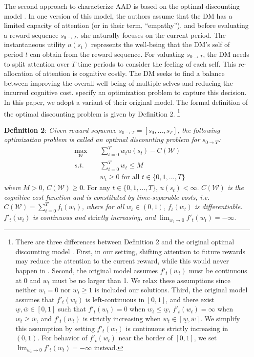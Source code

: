 \documentclass[
  12pt,
]{article}
\begin{document}
The second approach to characterize AAD is based on the optimal
discounting model \citep{noor2022optimal,noor2024constrained}. In one
version of this model, the authors assume that the DM has a limited
capacity of attention (or in their term, ``empathy''), and before
evaluating a reward sequence \(s_{0\rightarrow T}\), she naturally
focuses on the current period. The instantaneous utility \(u(s_t)\)
represents the well-being that the DM's self of period \(t\) can obtain
from the reward sequence. For valuating \(s_{0\rightarrow T}\), the DM
needs to split attention over \(T\) time periods to consider the feeling
of each self. This re-allocation of attention is cognitive costly. The
DM seeks to find a balance between improving the overall well-being of
multiple selves and reducing the incurred cognitive cost.
\citet{noor2022optimal,noor2024constrained} specify an optimization
problem to capture this decision. In this paper, we adopt a variant of
their original model. The formal definition of the optimal discounting
problem is given by Definition 2. \footnote{There are three differences
  between Definition 2 and the original optimal discounting model
  \citep{noor2022optimal,noor2024constrained}. First, in our setting,
  shifting attention to future rewards may reduce the attention to the
  current reward, while this would never happen in
  \citet{noor2022optimal,noor2024constrained}. Second, the original
  model assumes \(f'_t(w_t)\) must be continuous at 0 and \(w_t\) must
  be no larger than 1. We relax these assumptions since neither
  \(w_t=0\) nor \(w_t\geq1\) is included our solutions. Third, the
  original model assumes that \(f'_t(w_t)\) is left-continuous in
  \([0,1]\), and there exist \(\underline{w},\bar{w}\in[0,1]\) such that
  \(f'_t(w_t)=0\) when \(w_t\leq\underline{w}\), \(f'_t(w_t)=\infty\)
  when \(w_t\geq\bar{w}\), and \(f'_t(w_t)\) is strictly increasing when
  \(w_t \in [\underline{w},\bar{w}]\). We simplify this assumption by
  setting \(f'_t(w_t)\) is continuous strictly increasing in \((0,1)\).
  For behavior of \(f'_t(w_t)\) near the border of \([0,1]\), we set
  \(\lim_{w_t\rightarrow 0} f'_t(w_t)=-\infty\) instead.}

\noindent \textbf{Definition 2}: \emph{Given reward sequence}
\(s_{0\rightarrow T}=[s_0,...,s_T]\)\emph{, the following optimization
problem is called an optimal discounting problem for}
\(s_{0\rightarrow T}\)\emph{:}\[
\begin{aligned}
&\max_{\mathcal{W}}\;&&\sum_{t=0}^T w_tu(s_t) - C(\mathcal{W}) \\
&s.t.\; &&\sum_{t=0}^Tw_t \leq M \\
&&& w_t \geq 0 \text{ for all } t\in \{0,1,...,T\}
\end{aligned}
\]\emph{where} \(M>0\)\emph{,} \(C(\mathcal{W})\geq 0\). For any
\(t\in\{0,1,…,T\}\), \(u(s_t)<\infty\). \(C(\mathcal{W})\) \emph{is the
cognitive cost function and is constituted by time-separable costs,
i.e.} \(C(\mathcal{W})=\sum_{t=0}^Tf_t(w_t)\)\emph{, where for all}
\(w_t\in(0,1)\)\emph{,} \(f_t(w_t)\) \emph{is differentiable.}
\(f'_t(w_t)\) \emph{is continuous and} stric\emph{tly increasing, and}
\(\lim_{w_t\rightarrow 0} f'_t(w_t)=-\infty\).
\end{document}
